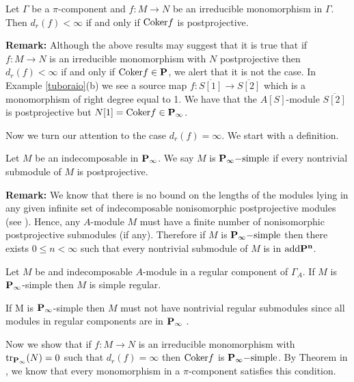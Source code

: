 \begin{cor}
Let $\Gamma$ be a $\pi$-component and  $f:M \rightarrow N$ be an irreducible monomorphism in $\Gamma$. Then $d_r(f)<{\infty}$ if and only if ${\rm Coker}f $ is  postprojective.
\end{cor} 

\par\noindent
{\bf Remark:} Although the above results may suggest that it is true that if $f:M \rightarrow N$ is an irreducible monomorphism with $N$ postprojective then $d_r(f)<{\infty}$ if and only if ${\rm Coker}f \in {\bf P}$, we alert that it is not the case. In Example \ref{tuboraio}(b) we see a source map $f:\overline{S[1]} \rightarrow \overline{S[2]}$ which is a monomorphism of right degree equal to 1. We have that the $A[S]$-module $\overline{S[2]}$ is postprojective but $N[1]={\rm Coker}f \in {\bf P}_{\infty}$.
\vspace{ .3 cm}

Now we turn our attention to the case $d_r(f)={\infty}$. We start with a definition. 

\begin{defn}
Let $M$ be an indecomposable in ${\bf P_{\infty}}$. We say $M$ is ${\bf P_{\infty}-}{\rm simple}$ if every nontrivial submodule of $M$ is postprojective.
\end{defn}

\par\noindent
{\bf Remark:} We know that there is no bound on the lengths of the modules lying in any given infinite set of 
indecomposable nonisomorphic postprojective modules (see \cite{auslander}). Hence, any $A$-module $M$ must have a finite number of 
nonisomorphic postprojective submodules (if any). Therefore if $M$ is ${\bf P_{\infty}-}{\rm simple}$ then there exists $0 \leq n < {\infty}$ such that every nontrivial submodule of $M$ is in ${\rm add}{\bf P^n}$.

\begin{prop}
Let $M$ be and indecomposable $A$-module in a regular component of $\Gamma_A$. If $M$ is ${\bf P}_{\infty}$-simple then $M$ is simple regular.
\end{prop}
\begin{pf}
If M is ${\bf P}_{\infty}$-simple then $M$ must not have nontrivial regular submodules since all modules in regular components are in ${\bf P}_{\infty}$ . 
\end{pf}

Now we show that if $f:M \rightarrow N$ is an irreducible monomorphism with ${\rm tr}_{{\bf P_{\infty}}}(N)=0$ such that $d_r(f)={\infty}$ then ${\rm Coker}f$ is ${\bf P_{\infty}-}{\rm simple}$. By Theorem in \cite{coelho2}, we know that every monomorphism in a $\pi$-component satisfies this condition.

